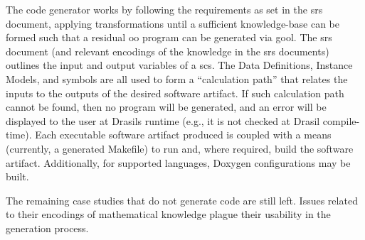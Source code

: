 The code generator works by following the requirements as set in the \acs{srs}
document, applying transformations until a sufficient knowledge-base can be
formed such that a residual \acs{oo} program can be generated via \acs{gool}.
The \acs{srs} document (and relevant encodings of the knowledge in the \acs{srs}
documents) outlines the input and output variables of a \acs{scs}. The Data
Definitions, Instance Models, and symbols are all used to form a ``calculation
path'' that relates the inputs to the outputs of the desired software artifact.
If such calculation path cannot be found, then no program will be generated, and
an error will be displayed to the user at Drasils runtime (e.g., it is not
checked at Drasil compile-time). Each executable software artifact produced is
coupled with a means (currently, a generated Makefile) to run and, where
required, build the software artifact. Additionally, for supported languages,
Doxygen \cite{Doxygen} configurations may be built.

The remaining case studies that do not generate code are still left. Issues
related to their encodings of mathematical knowledge plague their usability in
the generation process.
